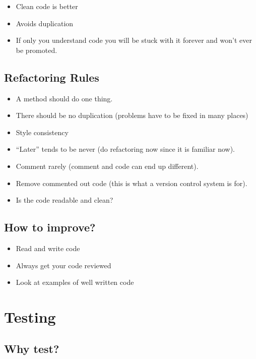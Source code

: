 \begin{itemize}
    \item Clean code is better
    \item Avoids duplication
    \item If only you understand code you will be stuck with it forever and won't ever be promoted.
\end{itemize}

\subsection{Refactoring Rules}\label{sub:refactoring_rules}

\begin{itemize}
    \item A method should do one thing.
    \item There should be no duplication (problems have to be fixed in many places)
    \item Style consistency
    \item ``Later'' tends to be never (do refactoring now since it is familiar now).
    \item Comment rarely (comment and code can end up different).
    \item Remove commented out code (this is what a version control system is for).
    \item Is the code readable and clean?
\end{itemize}

\subsection{How to improve?}\label{sub:how_to_improve_}

\begin{itemize}
    \item Read and write code
    \item Always get your code reviewed
    \item Look at examples of well written code
\end{itemize}

\section{Testing}\label{sec:testing}

\subsection{Why test?}\label{sub:why_test_}


